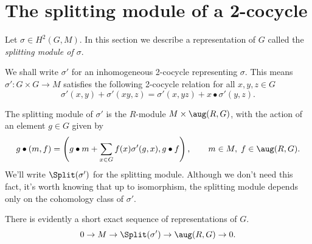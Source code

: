 





\section{The splitting module of a 2-cocycle}

Let $\sigma \in H^2(G,M)$.
In this section we describe a representation of $G$ called the \emph{splitting module of $\sigma$}.

We shall write $\sigma'$ for an inhomogeneous 2-cocycle representing $\sigma$.
This means $\sigma' : G \times G \to M$ satisfies the following 2-cocycle
relation for all $x,y,z\in G$
\begin{equation} \label{def:2-cocycle relation}
	\sigma'(x,y) + \sigma'(xy,z) = \sigma'(x,yz) + x \bullet \sigma'(y,z).
\end{equation}


\begin{definition} \label{def:splitting module}
	The splitting module of $\sigma'$ is the $R$-module $M \times \aug(R,G)$,
	with the action of an element $g \in G$ given by
	\[
		g \bullet (m,f)
		= \left(g \bullet m + \sum_{x \in G} f(x) \sigma'(g,x) , g \bullet f\right),
		\qquad m \in M, \; f \in \aug(R,G).
	\]
	We'll write $\Split(\sigma')$ for the splitting module.
	Although we don't need this fact, it's worth knowing that up to isomorphism,
	the splitting module depends only on the cohomology class of $\sigma'$.
\end{definition}

There is evidently a short exact sequence of representations of $G$.
\begin{equation}\label{eq:split ses}
	0 \to M \to \Split(\sigma') \to \aug(R,G) \to 0.
\end{equation}

